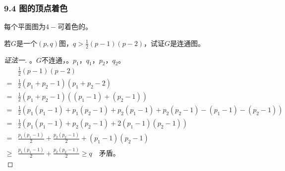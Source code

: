 \documentclass{beamer}
\begin{document}
\begin{CJK}{UTF8}{gbsn}

\begin{frame}
  \frametitle{9.4 图的顶点着色}
  \begin{Thm}
    每个平面图为$4-$可着色的。
  \end{Thm}
\end{frame}
\begin{frame}

  {\small
  \begin{Exercise}
    若$G$是一个$(p,q)$图，$q > \frac{1}{2}(p-1)(p-2)$，试证$G$是连通图。  
  \end{Exercise}}
  {\small
\pause\begin{proof}[证法一]\justifying\let\raggedright\justifying
      。$G$不连通，。$p_1$，$q_1$，$p_2$，$q_2$。
    \begin{equation*}
      \begin{split}
       &\frac{1}{2}(p-1)(p-2)\\
        =&\frac{1}{2}(p_1 + p_2 -1)(p_1 + p_2 -2)\\
      =&\frac{1}{2}(p_1 + p_2 -1)((p_1 - 1) + (p_2 - 1))\\
      =&\frac{1}{2}(p_1(p_1 -1) +  p_1(p_2 - 1) + p_2(p_1 - 1) + p_2(p_2-1) - (p_1 - 1) - (p_2-1))\\
      =&\frac{1}{2}(p_1(p_1 -1) +   p_2(p_2-1) + 2(p_1 - 1)(p_2-1))\\
      =&\frac{p_1(p_1 -1)}{2} +   \frac{p_2(p_2-1)}{2} + (p_1 - 1)(p_2-1)\\
      \geq&\frac{p_1(p_1 -1)}{2} +   \frac{p_2(p_2-1)}{2}
       \geq  q \quad \text{矛盾。}
      \end{split}
    \end{equation*}
    

\end{proof}}
\end{frame}
\end{CJK}
\end{document}
